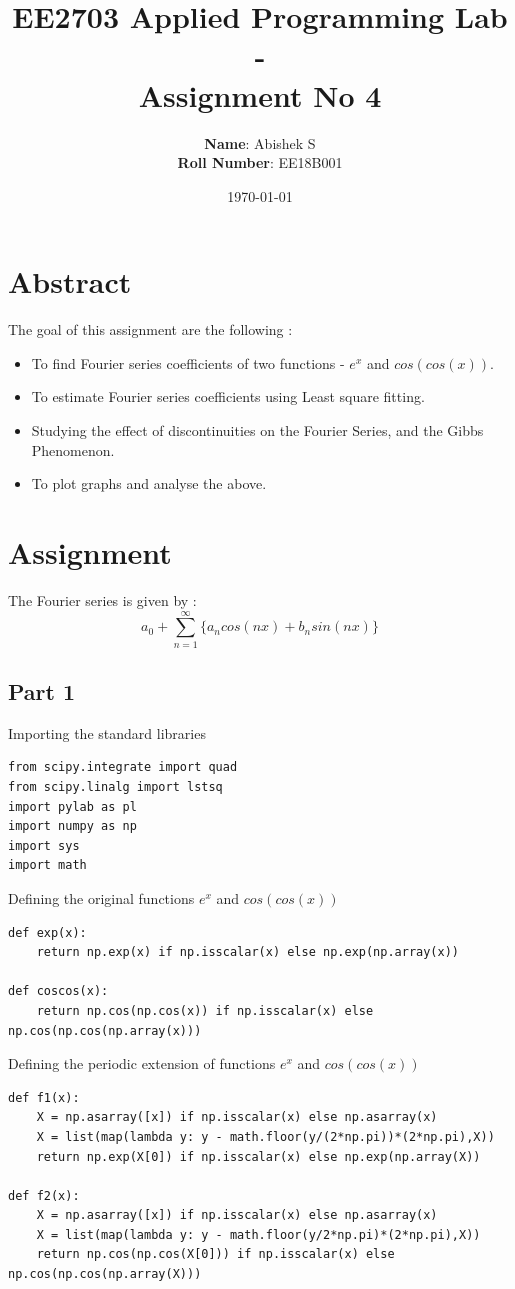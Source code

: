 \documentclass[11pt, a4paper]{article}
\title{EE2703 Applied Programming Lab - \\Assignment No 4}
\author{
  \textbf{Name}: Abishek S\\
  \textbf{Roll Number}: EE18B001
}\date{\today}
\begin{document}
		
\maketitle 
\section{Abstract}
The goal of this assignment are the following :
\begin{itemize}
\item To find Fourier series coefficients of two functions - $e^{x}$ and $cos(cos(x))$.
\item To estimate Fourier series coefficients using Least square fitting.
\item Studying the effect of discontinuities on the Fourier Series, and the Gibbs Phenomenon.
\item To plot graphs and analyse the above.
\end{itemize}

\section{Assignment}
The Fourier series is given by :
\begin{equation}\label{eq:fs1}
a_0 + \sum_{n=1}^{\infty} \{a_n cos(nx) + b_n sin(nx)\}
\end{equation}
\subsection{Part 1}
Importing the standard libraries
\begin{verbatim}
from scipy.integrate import quad
from scipy.linalg import lstsq
import pylab as pl
import numpy as np
import sys
import math
\end{verbatim}
Defining the original functions $e^{x}$ and $cos(cos(x))$
\begin{verbatim}
def exp(x):
	return np.exp(x) if np.isscalar(x) else np.exp(np.array(x))

def coscos(x):
	return np.cos(np.cos(x)) if np.isscalar(x) else np.cos(np.cos(np.array(x)))
\end{verbatim}
Defining the periodic extension of functions $e^{x}$ and $cos(cos(x))$
\begin{verbatim}
def f1(x):
	X = np.asarray([x]) if np.isscalar(x) else np.asarray(x)
	X = list(map(lambda y: y - math.floor(y/(2*np.pi))*(2*np.pi),X))
	return np.exp(X[0]) if np.isscalar(x) else np.exp(np.array(X))

def f2(x):
	X = np.asarray([x]) if np.isscalar(x) else np.asarray(x)
	X = list(map(lambda y: y - math.floor(y/2*np.pi)*(2*np.pi),X))
	return np.cos(np.cos(X[0])) if np.isscalar(x) else np.cos(np.cos(np.array(X)))
\end{verbatim}
\end{document}
